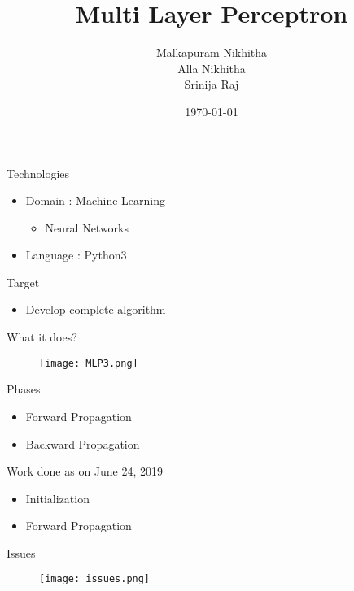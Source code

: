 \documentclass{beamer}
\title{Multi Layer Perceptron }
\author{ Malkapuram Nikhitha \\ Alla Nikhitha \\ Srinija Raj}
\institute[WE]{ TalentSprint - WE program }
\date{\today}
\begin{document}
\begin{frame}
  \titlepage
\end{frame}



\begin{frame}{Technologies}
\begin{itemize}
  \item  Domain : Machine Learning
  \begin{itemize}
      \item Neural Networks
  \end{itemize}
  \item Language : Python3
\end{itemize}
\end{frame}



\begin{frame}{Target}
\begin{itemize}
  \item Develop complete algorithm 
\end{itemize}
\end{frame}

\begin{frame}{What it does?}
\begin{figure}
    \texttt{[image: MLP3.png]}
\end{figure}
\end{frame}


    
\begin{frame}{Phases}
    \begin{itemize}
        \item 
        Forward Propagation
        \item 
        Backward Propagation
    \end{itemize}
\end{frame}
    
\begin{frame}{Work done as on June 24, 2019}
    \begin{itemize}
        \item Initialization
        \item Forward Propagation
       
            
    \end{itemize}
\end{frame}

\begin{frame}{Issues}
    \begin{figure}
        \centering
        \texttt{[image: issues.png]}
    \end{figure}
\end{frame}
    
\end{document}

